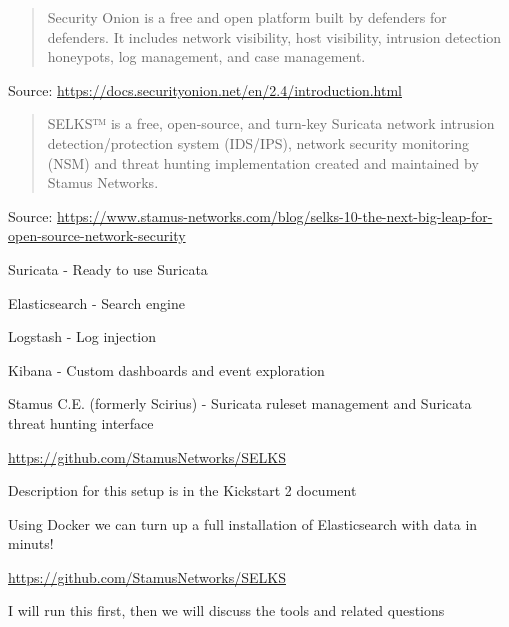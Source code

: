 \documentclass[Screen16to9,17pt]{foils}
\begin{document}


\begin{quote}
Security Onion is a free and open platform built by defenders for defenders. It includes network visibility, host visibility, intrusion detection honeypots, log management, and case management.
\end{quote}
Source:  \url{https://docs.securityonion.net/en/2.4/introduction.html}



\begin{quote}
SELKS™ is a free, open-source, and turn-key Suricata network intrusion detection/protection system (IDS/IPS), network security monitoring (NSM) and threat hunting implementation created and maintained by Stamus Networks.
\end{quote}
Source: \url{https://www.stamus-networks.com/blog/selks-10-the-next-big-leap-for-open-source-network-security}

\begin{list2}
\item Suricata - Ready to use Suricata
\item Elasticsearch - Search engine
\item Logstash - Log injection
\item Kibana - Custom dashboards and event exploration
\item Stamus C.E. (formerly Scirius) - Suricata ruleset management and Suricata threat hunting interface
\end{list2}
\url{https://github.com/StamusNetworks/SELKS}



\begin{list2}
\item Description for this setup is in the Kickstart 2 document
\item Using Docker we can turn up a full installation of Elasticsearch with data in minuts!
\item \url{https://github.com/StamusNetworks/SELKS}
\end{list2}


\slide{}


I will run this first, then we will discuss the tools and related questions
\end{document}
